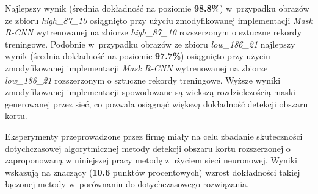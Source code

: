 Najlepszy wynik (średnia dokładność na poziomie \textbf{98.8\%}) w~przypadku obrazów ze zbioru \textit{high\_87\_10} osiągnięto przy użyciu zmodyfikowanej implementacji \textit{Mask R-CNN} wytrenowanej na zbiorze \textit{high\_87\_10} rozszerzonym o sztuczne rekordy treningowe. Podobnie w~przypadku obrazów ze zbioru \textit{low\_186\_21} najlepszy wynik (średnia dokładność na poziomie \textbf{97.7\%}) osiągnięto przy użyciu zmodyfikowanej implementacji \textit{Mask R-CNN} wytrenowanej na zbiorze \textit{low\_186\_21} rozszerzonym o sztuczne rekordy treningowe. Wyższe wyniki zmodyfikowanej implementacji spowodowane są wiekszą rozdzielczością maski generowanej przez sieć, co pozwala osiągnąć większą dokładność detekcji obszaru kortu.

Eksperymenty przeprowadzone przez firmę \blue{} miały na celu zbadanie skuteczności dotychczasowej algorytmicznej metody detekcji obszaru kortu rozszerzonej o zaproponowaną w niniejszej pracy metodę z użyciem sieci neuronowej. Wyniki wskazują na znaczący (\textbf{10.6} punktów procentowych) wzrost dokładności takiej łączonej metody w~porównaniu do dotychczasowego rozwiązania.
